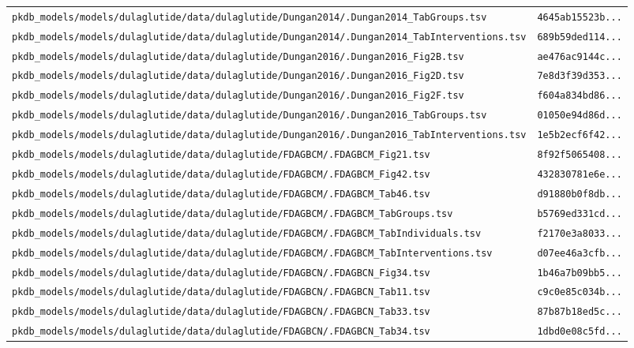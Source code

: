 \documentclass{article}
\begin{document}
\begin{longtable}{ll}
\texttt{pkdb\_models/models/dulaglutide/data/dulaglutide/Dungan2014/.Dungan2014\_TabGroups.tsv} & \texttt{4645ab15523b...} \\
\texttt{pkdb\_models/models/dulaglutide/data/dulaglutide/Dungan2014/.Dungan2014\_TabInterventions.tsv} & \texttt{689b59ded114...} \\
\texttt{pkdb\_models/models/dulaglutide/data/dulaglutide/Dungan2016/.Dungan2016\_Fig2B.tsv} & \texttt{ae476ac9144c...} \\
\texttt{pkdb\_models/models/dulaglutide/data/dulaglutide/Dungan2016/.Dungan2016\_Fig2D.tsv} & \texttt{7e8d3f39d353...} \\
\texttt{pkdb\_models/models/dulaglutide/data/dulaglutide/Dungan2016/.Dungan2016\_Fig2F.tsv} & \texttt{f604a834bd86...} \\
\texttt{pkdb\_models/models/dulaglutide/data/dulaglutide/Dungan2016/.Dungan2016\_TabGroups.tsv} & \texttt{01050e94d86d...} \\
\texttt{pkdb\_models/models/dulaglutide/data/dulaglutide/Dungan2016/.Dungan2016\_TabInterventions.tsv} & \texttt{1e5b2ecf6f42...} \\
\texttt{pkdb\_models/models/dulaglutide/data/dulaglutide/FDAGBCM/.FDAGBCM\_Fig21.tsv} & \texttt{8f92f5065408...} \\
\texttt{pkdb\_models/models/dulaglutide/data/dulaglutide/FDAGBCM/.FDAGBCM\_Fig42.tsv} & \texttt{432830781e6e...} \\
\texttt{pkdb\_models/models/dulaglutide/data/dulaglutide/FDAGBCM/.FDAGBCM\_Tab46.tsv} & \texttt{d91880b0f8db...} \\
\texttt{pkdb\_models/models/dulaglutide/data/dulaglutide/FDAGBCM/.FDAGBCM\_TabGroups.tsv} & \texttt{b5769ed331cd...} \\
\texttt{pkdb\_models/models/dulaglutide/data/dulaglutide/FDAGBCM/.FDAGBCM\_TabIndividuals.tsv} & \texttt{f2170e3a8033...} \\
\texttt{pkdb\_models/models/dulaglutide/data/dulaglutide/FDAGBCM/.FDAGBCM\_TabInterventions.tsv} & \texttt{d07ee46a3cfb...} \\
\texttt{pkdb\_models/models/dulaglutide/data/dulaglutide/FDAGBCN/.FDAGBCN\_Fig34.tsv} & \texttt{1b46a7b09bb5...} \\
\texttt{pkdb\_models/models/dulaglutide/data/dulaglutide/FDAGBCN/.FDAGBCN\_Tab11.tsv} & \texttt{c9c0e85c034b...} \\
\texttt{pkdb\_models/models/dulaglutide/data/dulaglutide/FDAGBCN/.FDAGBCN\_Tab33.tsv} & \texttt{87b87b18ed5c...} \\
\texttt{pkdb\_models/models/dulaglutide/data/dulaglutide/FDAGBCN/.FDAGBCN\_Tab34.tsv} & \texttt{1dbd0e08c5fd...} \\

\end{longtable}
\end{document}

